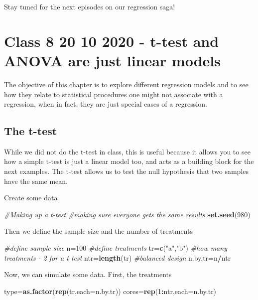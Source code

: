 \documentclass[
]{book}
\newenvironment{Shaded}{\begin{snugshade}}{\end{snugshade}}
\newcommand{\CommentTok}[1]{\textcolor[rgb]{0.56,0.35,0.01}{\textit{#1}}}
\newcommand{\DataTypeTok}[1]{\textcolor[rgb]{0.13,0.29,0.53}{#1}}
\newcommand{\DecValTok}[1]{\textcolor[rgb]{0.00,0.00,0.81}{#1}}
\newcommand{\KeywordTok}[1]{\textcolor[rgb]{0.13,0.29,0.53}{\textbf{#1}}}
\newcommand{\NormalTok}[1]{#1}
\newcommand{\OperatorTok}[1]{\textcolor[rgb]{0.81,0.36,0.00}{\textbf{#1}}}
\newcommand{\StringTok}[1]{\textcolor[rgb]{0.31,0.60,0.02}{#1}}
\begin{document}
Stay tuned for the next episodes on our regression saga!

\hypertarget{aula8}{%
\chapter{Class 8 20 10 2020 - t-test and ANOVA are just linear models}\label{aula8}}

The objective of this chapter is to explore different regression models and to see how they relate to statistical procedures one might not associate with a regression, when in fact, they are just special cases of a regression.

\hypertarget{the-t-test}{%
\section{The t-test}\label{the-t-test}}

While we did not do the t-test in class, this is useful because it allows you to see how a simple t-test is just a linear model too, and acts as a building block for the next examples. The t-test allows us to test the null hypothesis that two samples have the same mean.

Create some data

\begin{Shaded}
\begin{Highlighting}[]
\CommentTok{#Making up a t-test}
\CommentTok{#making sure everyone gets the same results}
\KeywordTok{set.seed}\NormalTok{(}\DecValTok{980}\NormalTok{)}
\end{Highlighting}
\end{Shaded}

Then we define the sample size and the number of treatments

\begin{Shaded}
\begin{Highlighting}[]
\CommentTok{#define sample size}
\NormalTok{n=}\DecValTok{100}
\CommentTok{#define treatments}
\NormalTok{tr=}\KeywordTok{c}\NormalTok{(}\StringTok{"a"}\NormalTok{,}\StringTok{"b"}\NormalTok{)}
\CommentTok{#how many treatments - 2 for a t test}
\NormalTok{ntr=}\KeywordTok{length}\NormalTok{(tr)}
\CommentTok{#balanced design}
\NormalTok{n.by.tr=n}\OperatorTok{/}\NormalTok{ntr}
\end{Highlighting}
\end{Shaded}

Now, we can simulate some data. First, the treatments

\begin{Shaded}
\begin{Highlighting}[]
\NormalTok{type=}\KeywordTok{as.factor}\NormalTok{(}\KeywordTok{rep}\NormalTok{(tr,}\DataTypeTok{each=}\NormalTok{n.by.tr))}
\NormalTok{cores=}\KeywordTok{rep}\NormalTok{(}\DecValTok{1}\OperatorTok{:}\NormalTok{ntr,}\DataTypeTok{each=}\NormalTok{n.by.tr)}
\end{Highlighting}
\end{Shaded}
\end{document}
